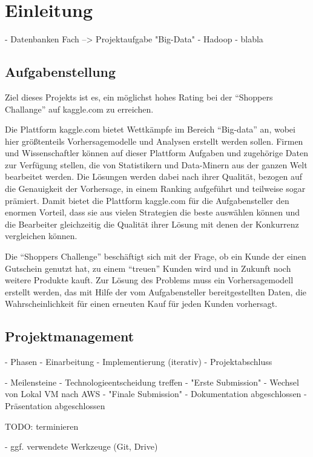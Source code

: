 \section{Einleitung}
- Datenbanken Fach --> Projektaufgabe "Big-Data"
- Hadoop
- blabla


\subsection{Aufgabenstellung}
Ziel dieses Projekts ist es, ein möglichst hohes Rating bei der "`Shoppers Challange"' auf kaggle.com zu erreichen.

Die Plattform kaggle.com bietet Wettkämpfe im Bereich "`Big-data"' an, wobei hier größtenteils Vorhersagemodelle und Analysen erstellt werden sollen. Firmen und Wissenschaftler können auf dieser Plattform Aufgaben und zugehörige Daten zur Verfügung stellen, die von Statistikern und Data-Minern aus der ganzen Welt bearbeitet werden. Die Lösungen werden dabei nach ihrer Qualität, bezogen auf die Genauigkeit der Vorhersage, in einem Ranking aufgeführt und teilweise sogar prämiert. Damit bietet die Plattform kaggle.com für die Aufgabensteller den enormen Vorteil, dass sie aus vielen Strategien die beste auswählen können und die Bearbeiter gleichzeitig die Qualität ihrer Lösung mit denen der Konkurrenz vergleichen können.

Die "`Shoppers Challenge"' beschäftigt sich mit der Frage, ob ein Kunde der einen Gutschein genutzt hat, zu einem "`treuen"' Kunden wird und in Zukunft noch weitere Produkte kauft. Zur Lösung des Problems muss ein Vorhersagemodell erstellt werden, das mit Hilfe der vom Aufgabensteller bereitgestellten Daten, die Wahrscheinlichkeit für einen erneuten Kauf für jeden Kunden vorhersagt. 

\subsection{Projektmanagement}
- Phasen
	- Einarbeitung
	- Implementierung (iterativ)
	- Projektabschluss
	
- Meilensteine
	- Technologieentscheidung treffen
	- "Erste Submission"
	- Wechsel von Lokal VM nach AWS
	- "Finale Submission" 
	- Dokumentation abgeschlossen
	- Präsentation abgeschlossen
	
	TODO: terminieren
	
- ggf. verwendete Werkzeuge (Git, Drive)





